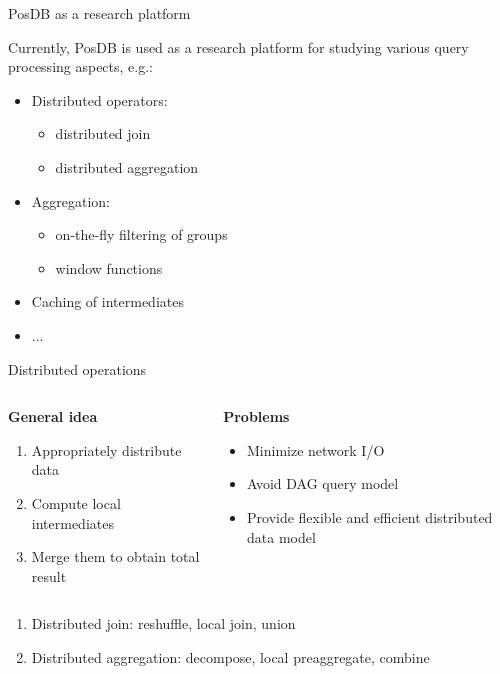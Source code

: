 \documentclass[compress, dvipsnames, unicode]{beamer}
\begin{document}
\begin{frame}{PosDB as a research platform}

Currently, PosDB is used as a research platform for studying various query processing aspects, e.g.:

    \begin{itemize}
        \item Distributed operators: 
        \begin{itemize}
            \item distributed join 
            \item distributed aggregation
        \end{itemize}
        \item Aggregation:
        \begin{itemize}
            \item on-the-fly filtering of groups
            \item window functions
        \end{itemize}
        \item Caching of intermediates
        \item ...
    \end{itemize}
\end{frame}


\begin{frame}{Distributed operations}
\begin{columns}
\begin{column}{0.45\textwidth}
   \begin{center}
       \textbf{\large General idea}
    \end{center}
    \begin{enumerate}
        \item Appropriately distribute data
        \item Compute local intermediates
        \item Merge them to obtain total result
    \end{enumerate}
\end{column}
\begin{column}{0.45\textwidth}
   \begin{center}
       \textbf{\large Problems}
    \end{center}
    \begin{itemize}
        \item Minimize network I/O
        \item Avoid DAG query model
        \item Provide flexible and efficient distributed data model
    \end{itemize}
\end{column}
\end{columns}
\vspace{3em}

\begin{enumerate}
    \item Distributed join: reshuffle, local join, union
    \item Distributed aggregation: decompose, local preaggregate, combine
\end{enumerate}
\end{frame}
\end{document}
